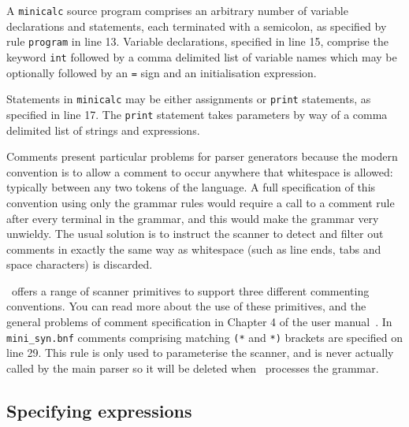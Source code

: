 A {\tt minicalc} source program comprises an arbitrary number of
variable declarations and statements, each terminated with a semicolon,
as specified by rule {\tt program} in line 13. Variable declarations,
specified in line 15, comprise the keyword {\tt int} followed by a comma
delimited list of variable names which may be optionally followed by an
{\tt =} sign and an initialisation expression. 

Statements in {\tt minicalc} may be either
assignments or {\tt print} statements, as specified in line 17. The
{\tt print} statement takes parameters by way of a comma delimited list of
strings and expressions.

Comments present particular problems for parser generators because the modern
convention is to allow a comment to occur anywhere that whitespace is allowed: typically
between any two tokens of the language. A full specification of this convention using
only the grammar rules would require a call to a comment rule after every terminal in the
grammar, and this would make the grammar very unwieldy. The usual solution is to instruct the
scanner to detect and filter out comments in exactly the same way as whitespace (such as
line ends, tabs and space characters) is discarded.

\rdp\ offers a range of scanner primitives to support three different commenting conventions.
You can read more about the use of these primitives, and the general problems of comment
specification in Chapter 4 of the user manual~\cite{rdp:user:1.5}.
In \verb+mini_syn.bnf+  comments comprising matching \verb+(*+ and
\verb+*)+ brackets are specified on line 29. This rule is only used to
parameterise the scanner, and is never actually called by the main
parser so it will be deleted when \rdp\ processes the grammar.

\subsection{Specifying expressions}

